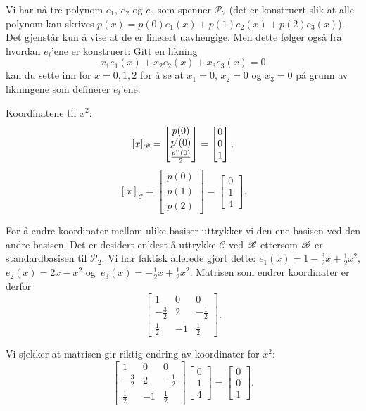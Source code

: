 \begin{losning}
\begin{punkt}
\noindent
Vi har nå tre polynom $e_1$, $e_2$ og $e_3$ som spenner $\mathcal{P}_2$ (det er konstruert slik at alle polynom kan skrives $p(x)=p(0)e_1(x)+p(1)e_2(x)+p(2)e_3(x)$). Det gjenstår kun å vise at de er lineært uavhengige. Men dette følger også fra hvordan $e_i$'ene er konstruert: Gitt en likning $$x_1e_1(x)+x_2e_2(x)+x_3e_3(x)=0$$ kan du sette inn for $x=0,1,2$ for å se at $x_1=0$, $x_2=0$ og $x_3=0$ på grunn av likningene som definerer $e_i$'ene.
\end{punkt}

\begin{punkt}
Koordinatene til $x^2$: $$[x]_{\mathscr{B}}=\begin{bmatrix}
p(0)\\
p'(0)\\
\frac{p''(0)}{2}
\end{bmatrix}=\begin{bmatrix}
0\\
0\\
1
\end{bmatrix},$$ $$[x]_{\mathscr{C}}=\begin{bmatrix}
p(0)\\
p(1)\\
p(2)
\end{bmatrix}=\begin{bmatrix}
0\\
1\\
4
\end{bmatrix}.$$
\end{punkt}

\begin{punkt}
For å endre koordinater mellom ulike basiser uttrykker vi den ene basisen ved den andre basisen. Det er desidert enklest å uttrykke $\mathscr{C}$ ved $\mathscr{B}$ ettersom $\mathscr{B}$ er standardbasisen til $\mathcal{P}_2$. Vi har faktisk allerede gjort dette: $e_1(x)=1-\frac{3}{2}x+\frac{1}{2}x^2$, $e_2(x)=2x-x^2$ og~$e_3(x)=-\frac{1}{2}x+\frac{1}{2}x^2$. Matrisen som endrer koordinater er derfor
$$
\begin{bmatrix}
1 & 0 & 0\\
-\frac{3}{2} & 2 & -\frac{1}{2}\\
\frac{1}{2} & -1 & \frac{1}{2}
\end{bmatrix}.$$

\noindent
Vi sjekker at matrisen gir riktig endring av koordinater for $x^2$:
$$
\begin{bmatrix}
1 & 0 & 0\\
-\frac{3}{2} & 2 & -\frac{1}{2}\\
\frac{1}{2} & -1 & \frac{1}{2}
\end{bmatrix}\begin{bmatrix}
0\\
1\\
4
\end{bmatrix}=\begin{bmatrix}
0\\
0\\
1
\end{bmatrix}.$$

\end{punkt}

\end{losning}
